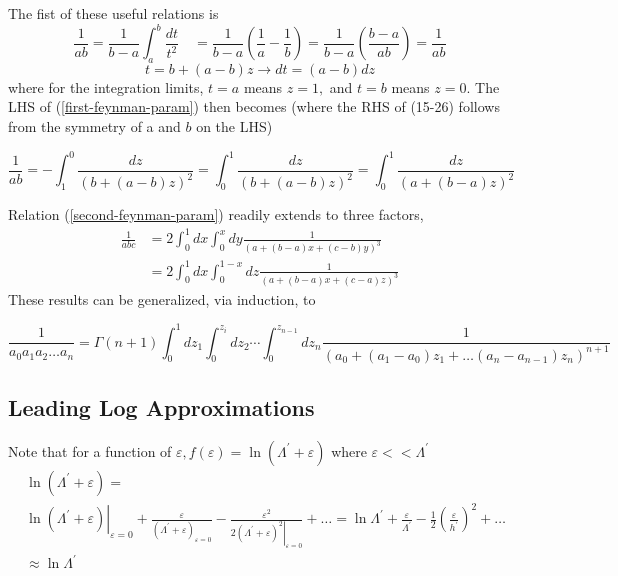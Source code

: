The fist of these useful relations is 
\begin{equation}\frac{1}{a b}=\frac{1}{b-a} \int_{a}^{b} \frac{d t}{t^{2}} \quad=\frac{1}{b-a}\left(\frac{1}{a}-\frac{1}{b}\right)=\frac{1}{b-a}\left(\frac{b-a}{a b}\right)=\frac{1}{a b}
\label{first-feynman-param}
\end{equation}
$$t=b+(a-b) z \rightarrow d t=(a-b) d z$$
where for the integration limits, $ t=a$ means $z=1,$ and $t=b$ means $z=0 .$ The LHS of (\ref{first-feynman-param}) then becomes (where the RHS of (15-26) follows from the symmetry of a and $b$ on the LHS)
\begin{qt}
    \begin{equation}\frac{1}{a b}=-\int_{1}^{0} \frac{d z}{(b+(a-b) z)^{2}}=\int_{0}^{1} \frac{d z}{(b+(a-b) z)^{2}}=\int_{0}^{1} \frac{d z}{(a+(b-a) z)^{2}}
    \label{second-feynman-param}
    \end{equation}
\end{qt}
Relation (\ref{second-feynman-param}) readily extends to three factors, 
\begin{equation}\begin{aligned}
\frac{1}{a b c} &=2 \int_{0}^{1} d x \int_{0}^{x} d y \frac{1}{(a+(b-a) x+(c-b) y)^{3}} \\
&=2 \int_{0}^{1} d x \int_{0}^{1-x} d z \frac{1}{(a+(b-a) x+(c-a) z)^{3}}
\end{aligned}\end{equation}
These results can be generalized, via induction, to
\begin{qt}
    \begin{equation}\frac{1}{a_{0} a_{1} a_{2} \ldots a_{n}}=\Gamma(n+1) \int_{0}^{1} d z_{1} \int_{0}^{z_i} d z_{2} \cdots \int_{0}^{z_{n-1}} d z_{n} \frac{1}{\left(a_{0}+\left(a_{1}-a_{0}\right) z_{1}+\ldots\left(a_{n}-a_{n-1}\right) z_{n}\right)^{n+1}}\end{equation}
\end{qt}
\subsection{Leading Log Approximations}
Note that for a function of $\varepsilon, f(\varepsilon)=\ln \left(\Lambda^{\prime}+\varepsilon\right)$ where $\varepsilon<<\Lambda^{\prime}$
\begin{equation}\begin{aligned}
&\ln \left(\Lambda^{\prime}+\varepsilon\right)=\\
&\left.\ln \left(\Lambda^{\prime}+\varepsilon\right)\right|_{\varepsilon=0}+\frac{\varepsilon}{\left(\Lambda^{\prime}+\varepsilon\right)_{\varepsilon=0}}-\frac{\varepsilon^{2}}{\left.2\left(\Lambda^{\prime}+\varepsilon\right)^{2}\right|_{\varepsilon=0}}+\ldots=\ln \Lambda^{\prime}+\frac{\varepsilon}{\Lambda^{\prime}}-\frac{1}{2}\left(\frac{\varepsilon}{h^{\prime}}\right)^{2}+\dots\\
&\approx \ln{\Lambda^{\prime}}
\end{aligned}\end{equation}

